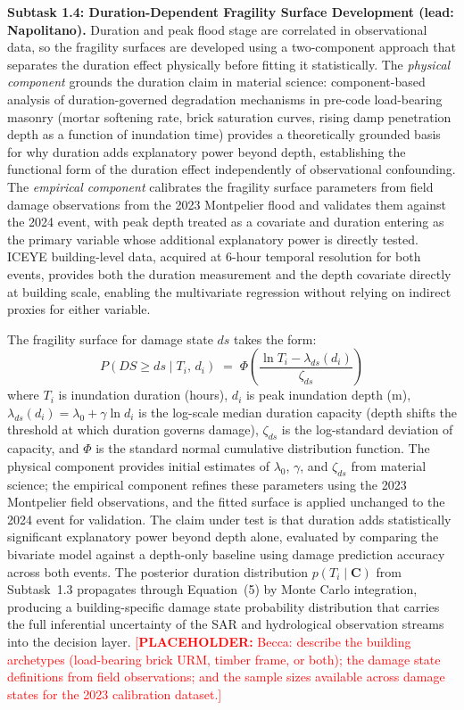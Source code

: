 \documentclass[11pt]{article}
\newcommand{\placeholder}[1]{\textcolor{red}{[\textbf{PLACEHOLDER:} #1]}}
\begin{document}
\textbf{Subtask 1.4: Duration-Dependent Fragility Surface Development (lead: Napolitano).}
Duration and peak flood stage are correlated in observational data, so the fragility surfaces are developed using a two-component approach that separates the duration effect physically before fitting it statistically.
The \textit{physical component} grounds the duration claim in material science: component-based analysis of duration-governed degradation mechanisms in pre-code load-bearing masonry (mortar softening rate, brick saturation curves, rising damp penetration depth as a function of inundation time) provides a theoretically grounded basis for why duration adds explanatory power beyond depth, establishing the functional form of the duration effect independently of observational confounding.
The \textit{empirical component} calibrates the fragility surface parameters from field damage observations from the 2023 Montpelier flood and validates them against the 2024 event, with peak depth treated as a covariate and duration entering as the primary variable whose additional explanatory power is directly tested.
ICEYE building-level data, acquired at 6-hour temporal resolution for both events, provides both the duration measurement and the depth covariate directly at building scale, enabling the multivariate regression without relying on indirect proxies for either variable.

The fragility surface for damage state $ds$ takes the form:
\begin{equation}
  P(DS \geq ds \mid T_i,\, d_i) \;=\; \Phi\!\left(\frac{\ln T_i - \lambda_{ds}(d_i)}{\zeta_{ds}}\right)
\end{equation}
where $T_i$ is inundation duration (hours), $d_i$ is peak inundation depth (m), $\lambda_{ds}(d_i) = \lambda_0 + \gamma \ln d_i$ is the log-scale median duration capacity (depth shifts the threshold at which duration governs damage), $\zeta_{ds}$ is the log-standard deviation of capacity, and $\Phi$ is the standard normal cumulative distribution function.
The physical component provides initial estimates of $\lambda_0$, $\gamma$, and $\zeta_{ds}$ from material science; the empirical component refines these parameters using the 2023 Montpelier field observations, and the fitted surface is applied unchanged to the 2024 event for validation.
The claim under test is that duration adds statistically significant explanatory power beyond depth alone, evaluated by comparing the bivariate model against a depth-only baseline using damage prediction accuracy across both events.
The posterior duration distribution $p(T_i \mid \mathbf{C})$ from Subtask~1.3 propagates through Equation~(5) by Monte Carlo integration, producing a building-specific damage state probability distribution that carries the full inferential uncertainty of the SAR and hydrological observation streams into the decision layer.
\placeholder{Becca: describe the building archetypes (load-bearing brick URM, timber frame, or both); the damage state definitions from field observations; and the sample sizes available across damage states for the 2023 calibration dataset.}
\end{document}
